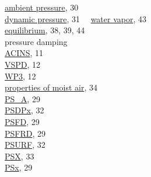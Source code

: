 \documentclass[
]{article}
\begin{document}
\hspace*{0.333em}\hspace*{0.333em}\hspace*{0.333em}\hspace*{0.333em}\href{./4-the-state-of-the-atmosphere.html\#psx}{ambient
pressure}, 30\\
\hspace*{0.333em}\hspace*{0.333em}\hspace*{0.333em}\hspace*{0.333em}\href{./4-the-state-of-the-atmosphere.html\#qcx}{dynamic
pressure}, 31 ~~\href{./4-the-state-of-the-atmosphere.html\#ewx}{water
vapor}, 43\\
\hspace*{0.333em}\hspace*{0.333em}\hspace*{0.333em}\hspace*{0.333em}\href{./4-the-state-of-the-atmosphere.html\#dewpt-corrected}{equilibrium},
38, 39, 44\\
pressure damping\\
\hspace*{0.333em}\hspace*{0.333em}\href{./3-the-state-of-the-aircraft.html\#acins}{ACINS},
11\\
\hspace*{0.333em}\hspace*{0.333em}\href{./3-the-state-of-the-aircraft.html\#vspd}{VSPD},
12\\
\hspace*{0.333em}\hspace*{0.333em}\href{./3-the-state-of-the-aircraft.html\#wp3}{WP3},
12\\
\href{./4-the-state-of-the-atmosphere.html\#moist-air}{properties of
moist air}, 34\\
\href{./4-the-state-of-the-atmosphere.html\#psx}{PS\_A}, 29\\
\href{./4-the-state-of-the-atmosphere.html\#p-special}{PSDPx}, 32\\
\href{./4-the-state-of-the-atmosphere.html\#psx}{PSFD}, 29\\
\href{./4-the-state-of-the-atmosphere.html\#psx}{PSFRD}, 29\\
\href{./4-the-state-of-the-atmosphere.html\#p-special}{PSURF}, 32\\
\href{./4-the-state-of-the-atmosphere.html\#psx}{PSX}, 33\\
\href{./4-the-state-of-the-atmosphere.html\#psx}{PSx}, 29\\
\end{document}
